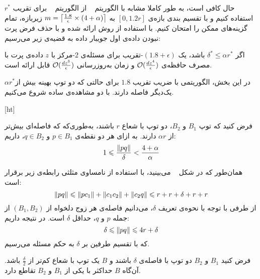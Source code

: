 

حال کافی است، به طور کاملا مشابه با الگوریتم ~ از‌ الگوریتم ~ برای تقریب $r^*$ استفاده کنیم و با تقسیم بندی بازه‌ی $[0, 1.2r]$ به $m = \left\lceil{\frac{1.8}{\epsilon} \times (4 + \alpha)}\right\rceil$ زیربازه، تمام گزینه‌های ممکن را امتحان کنیم. با استفاده از روش ارائه شده و با حذف فرض پرت نبودن داده‌ی اول جویبار داده به قضیه‌ی زیر می‌رسیم:


اگر $\delta^* \leq \alpha r^*$ باشد، یک $(1.8 + \epsilon)$-تقریب برای مسئله‌ی $2$-مرکز با $z$ داده‌ی پرت با مصرف حافظه‌ی $\mathcal{O}(\frac{dz^4}{\epsilon})$ و زمان به‌روزرسانی $\mathcal{O}(\frac{dz^5}{\epsilon})$ قابل ارائه است.



در این بخش، الگوریتمی با ضریب تقریب $1.8$ برای حالتی که دو توپ بهینه بیش از$\alpha r^*$  یک‌دیگر فاصله دارند. با دو مشاهده‌ی ساده شروع می‌کنیم.


[ht]

فرض کنید که توپ $B_1$ و $B_2$، دو توپ با شعاع $r$ باشند، به‌طوری‌که که فاصله‌ای بیش‌تر از $\alpha r$ دارند. به ازای هر دو نقطه‌ی $p \in B_1$ و $q \in B_2$، داریم:
$$1 \leqslant \frac{\|{pq}\|}{\delta} < \frac{4 + \alpha}{\alpha}$$


همان‌طور که در شکل ~ می‌بینید، با استفاده از نامساوی مثلثی رابطه‌ی زیر برقرار است:
$$\|{pq}\| \leqslant \|{pc_1}\| + \|{c_1c_2}\| + \|{c_2 q}\| \leqslant r + r + \delta + r + r$$ 
از‌ طرفی با توجه با نحوه‌ی تعریف $\delta$، می‌دانیم فاصله‌ی هر زوج دلخواه از $(B_1, B_2)$ از جمله $p$ و $q$، حداقل $\delta$ است. در نتیجه داریم:
$$\delta \leqslant \|{pq}\| \leqslant 4r + \delta$$
که با تقسیم طرفین بر $\delta$ به حکم مسئله می‌رسیم.



فرض کنید $B_1$ و $B_2$ دو توپ با فاصله‌ی $\delta$ باشند و $B$ یک توپ با شعاع کم‌تر از $\frac{\delta}{2}$ باشد. آن‌گاه $B$ حداکثر با یکی از $B_1$ و $B_2$ تقاطع دارد.


